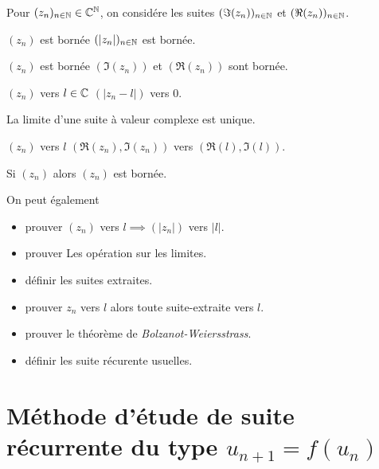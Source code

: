 Pour $(z_n)_{n \in \mathbb{N}} \in \mathbb{C}^{\mathbb{N}}$, on considére les suites
$(\Im(z_n))_{n \in \mathbb{N}}$ et $(\Re(z_n))_{n \in \mathbb{N}}$.

\begin{dfn}
$(z_n)$ est bornée \ssi $(|z_n|)_{n \in \mathbb{N}}$ est bornée.
\end{dfn}

\begin{prp}
$(z_n)$ est bornée \ssi $(\Im(z_n))$ et $(\Re(z_n))$ sont bornée.
\end{prp}

\begin{dfn}
$(z_n)$ \cv vers $l \in \mathbb{C}$ \ssi $(|z_n - l|)$ \cv vers $0$.
\end{dfn}

\begin{prp}
La limite d'une suite à valeur complexe est unique.
\end{prp}

\begin{prp}
$(z_n)$ \cv vers $l$ \ssi $(\Re(z_n), \Im(z_n))$ \cv vers
$(\Re(l), \Im(l))$.
\end{prp}

\begin{prp}
Si $(z_n)$ \cv alors $(z_n)$ est bornée.
\end{prp}

\begin{prp}
On peut également
\begin{itemize}
    \item prouver $(z_n)$ \cv vers $l \implies (|z_n|)$ \cv vers $|l|$.
    \item prouver Les opération sur les limites.
    \item définir les suites extraites.
    \item prouver $z_n$ \cv vers $l$ alors toute suite-extraite \cv vers $l$.
    \item prouver le théorème de \emph{Bolzanot-Weiersstrass}.
    \item définir les suite récurente usuelles.
\end{itemize}
\end{prp}


\section{Méthode d'étude de suite récurrente du type $u_{n + 1} = f(u_n)$}

